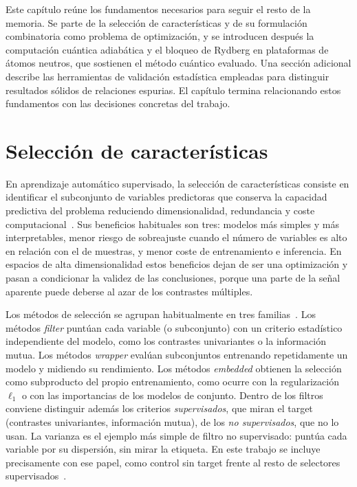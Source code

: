 
Este capítulo reúne los fundamentos necesarios para seguir el resto de
la memoria. Se parte de la selección de características y de su
formulación combinatoria como problema de optimización, y se introducen
después la computación cuántica adiabática y el bloqueo de Rydberg en
plataformas de átomos neutros, que sostienen el método cuántico
evaluado. Una sección adicional describe las herramientas de validación
estadística empleadas para distinguir resultados sólidos de relaciones
espurias. El capítulo termina relacionando estos fundamentos con las
decisiones concretas del trabajo.

\section{Selección de características}
\label{sec:mt-fs}

En aprendizaje automático supervisado, la selección de características
consiste en identificar el subconjunto de variables predictoras que
conserva la capacidad predictiva del problema reduciendo
dimensionalidad, redundancia y coste computacional~\cite{guyon2003}.
Sus beneficios habituales son tres: modelos más simples y más
interpretables, menor riesgo de sobreajuste cuando el número de
variables es alto en relación con el de muestras, y menor coste de
entrenamiento e inferencia. En espacios de alta dimensionalidad estos
beneficios dejan de ser una optimización y pasan a condicionar la
validez de las conclusiones, porque una parte de la señal aparente
puede deberse al azar de los contrastes múltiples.

Los métodos de selección se agrupan habitualmente en tres
familias~\cite{guyon2003}. Los métodos \emph{filter} puntúan cada
variable (o subconjunto) con un criterio estadístico independiente del
modelo, como los contrastes univariantes o la información mutua. Los
métodos \emph{wrapper} evalúan subconjuntos entrenando repetidamente un
modelo y midiendo su rendimiento. Los métodos \emph{embedded} obtienen la
selección como subproducto del propio entrenamiento, como ocurre con la
regularización $\ell_1$ o con las importancias de los modelos de
conjunto. Dentro de los filtros conviene distinguir además los criterios
\emph{supervisados}, que miran el target (contrastes univariantes,
información mutua), de los \emph{no supervisados}, que no lo usan. La
varianza es el ejemplo más simple de filtro no supervisado: puntúa cada
variable por su dispersión, sin mirar la etiqueta. En este trabajo se
incluye precisamente con ese papel, como control sin target frente al
resto de selectores supervisados~\cite{solorio2020}.

